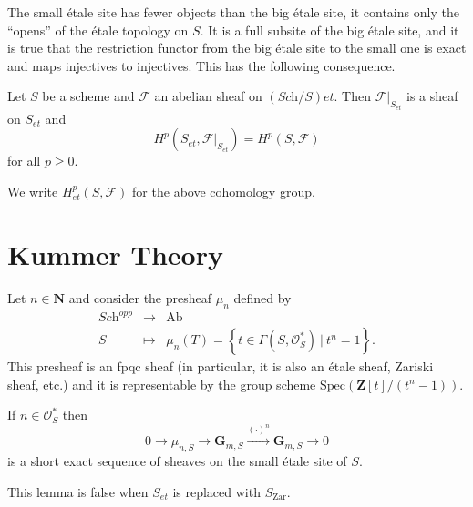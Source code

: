 \noindent
The small \'etale site has fewer objects than the big \'etale site, it contains 
only the ``opens'' of the \'etale topology on $S$. It is a full subsite of the 
big \'etale site, and it is true that the restriction functor from the big 
\'etale site to the small one is exact and maps injectives to injectives. This 
has the following consequence.

\begin{proposition}
\label{proposition-cohomology-restrict-small-site}
Let $S$ be a scheme and $\mathcal{F}$ an abelian sheaf on $(\textit{Sch}/S)et$. 
Then $\mathcal{F}|_{S_{et}}$ is a sheaf on $S_{et}$ and 
$$
H^p(S_{et}, \mathcal{F}|_{S_{et}}) = H^p(S, \mathcal{F}) 
$$
for all $p \geq 0$. 
\end{proposition}

\noindent
We write $H_{et}^p(S,\mathcal{F})$ for the above cohomology group.





\section{Kummer Theory}
\label{section-kummer}

\noindent
Let $n \in \mathbf{N}$ and consider the presheaf $\mu_n$ defined by
$$
\begin{matrix}
\textit{Sch}^{opp} & \longrightarrow  & \text{Ab} \\
S & \longmapsto &  \mu_n(T) =  \left\{t \in \Gamma(S, \mathcal{O}_S^*) \  | \ 
t^n = 1 \right\}.
\end{matrix}
$$
This presheaf is an fpqc sheaf (in particular, it is also an \'etale sheaf, 
Zariski sheaf, etc.) and it is representable by the group scheme $\text{Spec} 
(\mathbf{Z}[t]/(t^n-1))$. 

\begin{lemma}
\label{lemma-kummer-sequence}
If $n\in \mathcal{O}_S^*$ then 
$$
0\to \mu_{n, S} \to \mathbf{G}_{m, S} \xrightarrow{(\cdot)^n} \mathbf{G}_{m, 
S}\to 0
$$
is a short exact sequence of sheaves on the small \'etale site of  $S$. 
\end{lemma}

\begin{remark}
\label{remark-no-kummer-sequence-zariski}
This lemma is false when $S_{et}$ is replaced with $S_\mathrm{Zar}$.
\end{remark}

